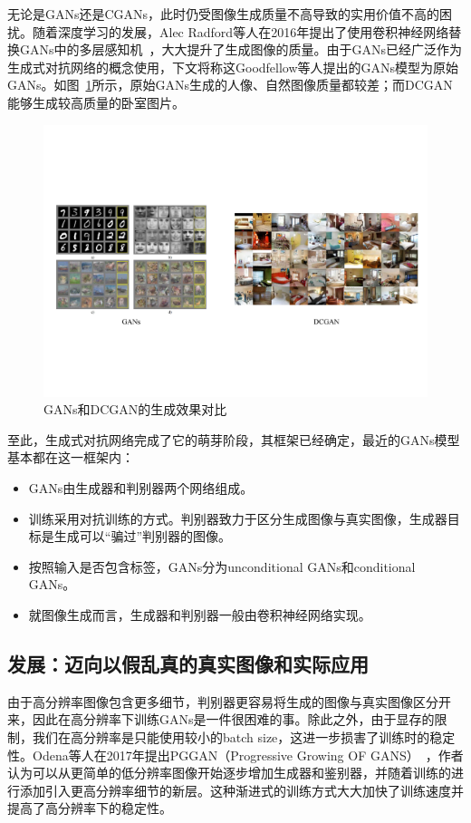 无论是GANs还是CGANs，此时仍受图像生成质量不高导致的实用价值不高的困扰。随着深度学习的发展，Alec Radford等人在2016年提出了使用卷积神经网络替换GANs中的多层感知机~\cite{DCGAN}，大大提升了生成图像的质量。由于GANs已经广泛作为生成式对抗网络的概念使用，下文将称这Goodfellow等人提出的GANs模型为原始GANs。如图~\ref{GAN-DCGAN}所示，原始GANs生成的人像、自然图像质量都较差；而DCGAN能够生成较高质量的卧室图片。

\begin{figure}
    \centering
    \includegraphics[width=\textwidth]{figures/GAN-DCGAN.pdf}
    \caption{GANs和DCGAN的生成效果对比}
    \label{GAN-DCGAN}
\end{figure}

至此，生成式对抗网络完成了它的萌芽阶段，其框架已经确定，最近的GANs模型基本都在这一框架内：

\begin{itemize}
\item GANs由生成器和判别器两个网络组成。
\item 训练采用对抗训练的方式。判别器致力于区分生成图像与真实图像，生成器目标是生成可以“骗过”判别器的图像。
\item 按照输入是否包含标签，GANs分为unconditional GANs和conditional GANs。
\item 就图像生成而言，生成器和判别器一般由卷积神经网络实现。
\end{itemize}

\subsection{发展：迈向以假乱真的真实图像和实际应用}
由于高分辨率图像包含更多细节，判别器更容易将生成的图像与真实图像区分开来，因此在高分辨率下训练GANs是一件很困难的事。除此之外，由于显存的限制，我们在高分辨率是只能使用较小的batch size，这进一步损害了训练时的稳定性。Odena等人在2017年提出PGGAN（Progressive Growing OF GANS）~\cite{PGGAN}，作者认为可以从更简单的低分辨率图像开始逐步增加生成器和鉴别器，并随着训练的进行添加引入更高分辨率细节的新层。这种渐进式的训练方式大大加快了训练速度并提高了高分辨率下的稳定性。

